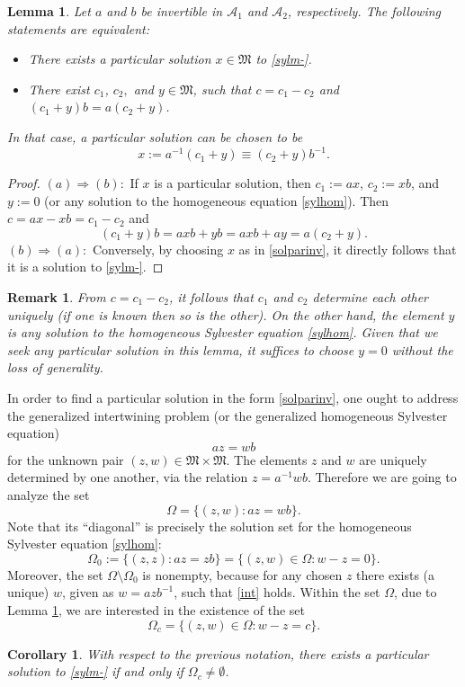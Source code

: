 \documentclass{article}
\newtheorem{remark}{Remark}[section]
\newtheorem{lemma}{Lemma}[section]
\newtheorem{corollary}{Corollary}[section]
\theoremstyle{definition}
\def\A{{\mathcal{A}}}
\def\M{\mathfrak{M}}
\begin{document}
\begin{lemma}
\label{C1C2Y}
Let $a$ and $b$ be invertible in $\A_1$ and $\A_2$, respectively. The following statements are equivalent:
\begin{itemize}
\item[(a)] There exists a particular solution $x\in\M$ to \eqref{sylm-}.
\item[(b)] There exist $c_1$, $c_2,$ and $y\in\M$, such that $c=c_1-c_2$ and $(c_1+y)b=a(c_2+y)$.
\end{itemize}  
In that case, a particular solution can be chosen to be 
\begin{equation}\label{solparinv}
x:=a^{-1}(c_1+y)\equiv (c_2+y)b^{-1}.\end{equation}
\end{lemma}
\begin{proof}
$(a)\Rightarrow(b):$ If $x$ is a particular solution, then $c_1:=ax$, $c_2:=xb$, and $y:=0$ (or any solution to the homogeneous equation \eqref{sylhom}). Then $c=ax-xb=c_1-c_2$ and
$$(c_1+y)b=axb+yb=axb+ay=a(c_2+y).$$
$(b)\Rightarrow(a):$ Conversely, by choosing $x$ as in \eqref{solparinv}, it directly follows that it is a solution to \eqref{sylm-}.
\end{proof}
\begin{remark} From $c=c_1-c_2$, it follows that $c_1$ and $c_2$ determine each other uniquely (if one is known then so is the other). On the other hand, the element $y$ is any solution to the homogeneous Sylvester equation \eqref{sylhom}. Given that we seek any particular solution in this lemma, it suffices to choose $y=0$ without the loss of generality. \end{remark}
In order to find a particular solution in the form \eqref{solparinv}, one ought to address the generalized intertwining problem (or the generalized homogeneous Sylvester equation)
\begin{equation}\label{int} az=wb 
\end{equation}
for the unknown pair $(z,w)\in\M\times \M$. The elements $z$ and $w$ are uniquely determined by one another, via the relation $z=a^{-1}wb$. Therefore we are going to analyze the set
\begin{equation}
\label{Omega}\Omega=\{(z,w): az=wb\}.
\end{equation}
Note that its ``diagonal''  is precisely the solution set for the homogeneous Sylvester equation \eqref{sylhom}:
\begin{equation}
\label{Omega0}\Omega_0:=\{(z,z): az=zb\}=\{(z,w)\in\Omega:w-z=0\}.\end{equation}
Moreover, the set $\Omega\setminus\Omega_0$ is nonempty, because for any chosen $z$ there exists (a unique) $w$, given as $w=azb^{-1}$, such that \eqref{int} holds. Within the set $\Omega$, due to Lemma \ref{C1C2Y}, we are interested in the existence of the set
\begin{equation}
\label{OmegaC}\Omega_c=\{(z,w)\in\Omega: w-z=c\}.\end{equation}
\begin{corollary}
With respect to the previous notation, there exists a particular solution to \eqref{sylm-} if and only if $\Omega_c\neq\emptyset$.
\end{corollary}
\end{document}
